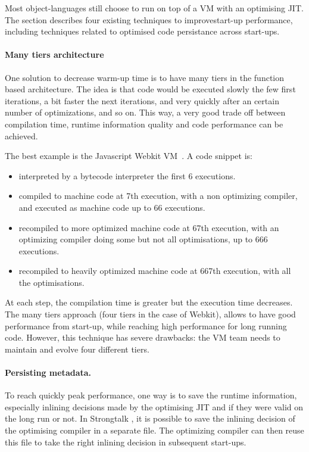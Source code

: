 \documentclass[a4paper,12pt,twoside]{../includes/ThesisStyle}
\begin{document}
Most object-languages still choose to run on top of a VM with an optimising JIT. The section describes four existing techniques to improvestart-up performance, including techniques related to optimised code persistance across start-ups.

\paragraph{Many tiers architecture}
One solution to decrease warm-up time is to have many tiers in the function based architecture. The idea is that code would be executed slowly the few first iterations, a bit faster the next iterations, and very quickly after an certain number of optimizations, and so on. This way, a very good trade off between compilation time, runtime information quality and code performance can be achieved.

The best example is the Javascript Webkit VM~\cite{Webkit15}. A code snippet is:
\begin{itemize}
\item interpreted by a bytecode interpreter the first 6 executions.
\item compiled to machine code at 7th execution, with a non optimizing compiler, and executed as machine code up to 66 executions.
\item recompiled to more optimized machine code at 67th execution, with an optimizing compiler doing some but not all optimisations, up to 666 executions.
\item recompiled to heavily optimized machine code at 667th execution, with all the optimisations.
\end{itemize}

At each step, the compilation time is greater but the execution time decreases. The many tiers approach (four tiers in the case of Webkit), allows to have good performance from start-up, while reaching high performance for long running code. However, this technique has severe drawbacks: the VM team needs to maintain and evolve four different tiers.

\paragraph{Persisting metadata.}

To reach quickly peak performance, one way is to save the runtime information, especially inlining decisions made by the optimising JIT and if they were valid on the long run or not. In Strongtalk \cite{Sun06}, it is possible to save the inlining decision of the optimising compiler in a separate file. The optimizing compiler can then reuse this file to take the right inlining decision in subsequent start-ups.
\end{document}
